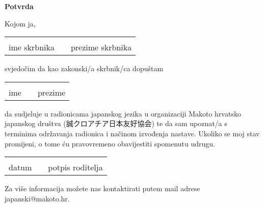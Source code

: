 
\author{Tomislav Mamić}

	
	\centering
	\vspace*{20pt}
	\Huge \textbf{Potvrda}
	
	\large\vspace{100pt}
	Kojom ja,
	
	\vspace{25pt}\small
	\begin{tabular}{p{150pt} p{50pt} p{150pt}}
		&&\\\cline{1-1}\cline{3-3}
		\centering ime skrbnika&&\centering prezime skrbnika\\
	\end{tabular}

	\vspace{20pt}\large
	svjedočim da kao zakonski/a skrbnik/ca dopuštam

	\vspace{25pt}\small
	\begin{tabular}{p{150pt} p{50pt} p{150pt}}
		&&\\\cline{1-1}\cline{3-3}
		\centering ime&&\centering prezime\\
	\end{tabular}

	\vspace{20pt}\large
	da sudjeluje u radionicama japanskog jezika u organizaciji Makoto hrvatsko japanskog društva (誠クロアチア日本友好協会) te da sam upoznat/a s terminima održavanja radionica i načinom izvođenja nastave. Ukoliko se moj stav promijeni, o tome ću pravovremeno obavijestiti spomenutu udrugu.

	\vspace{120pt}\small
	\begin{tabular}{p{150pt} p{50pt} p{150pt}}
		&&\\\cline{1-1}\cline{3-3}
		\centering datum&&\centering potpis roditelja\\
	\end{tabular}
	
	\vspace{30pt}
	Za više informacija možete nas kontaktirati putem mail adrese japanski@makoto.hr.
